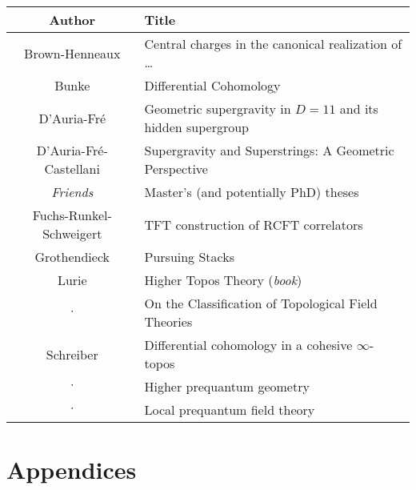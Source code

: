 \documentclass[11pt, a4paper]{report}
\begin{document}
    \begin{center}
        \begin{tabular}{|c|l|}
            \hline
            Author&Title\\
            \hline
            Brown-Henneaux&Central charges in the canonical realization of \ldots\\
			Bunke&Differential Cohomology\\
			D'Auria-Fr\'e&Geometric supergravity in $D=11$ and its hidden supergroup\\
			D'Auria-Fr\'e-Castellani&Supergravity and Superstrings: A Geometric Perspective\\
            \textit{Friends}&Master's (and potentially PhD) theses\\
            Fuchs-Runkel-Schweigert&TFT construction of RCFT correlators\\
            Grothendieck&Pursuing Stacks\\
            Lurie&Higher Topos Theory (\textit{book})\\
            $\cdot$&On the Classification of Topological Field Theories\\
            Schreiber&Differential cohomology in a cohesive $\infty$-topos\\
            $\cdot$&Higher prequantum geometry\\
            $\cdot$&Local prequantum field theory\\
            \hline
        \end{tabular}
    \end{center}

\part{Appendices}
\begin{appendices}




\end{appendices}

\nomenclature[S_zsyminto]{$]a,b[$}{open interval}

\printnomenclature

\nocite{*}



\printindex
\end{document}
